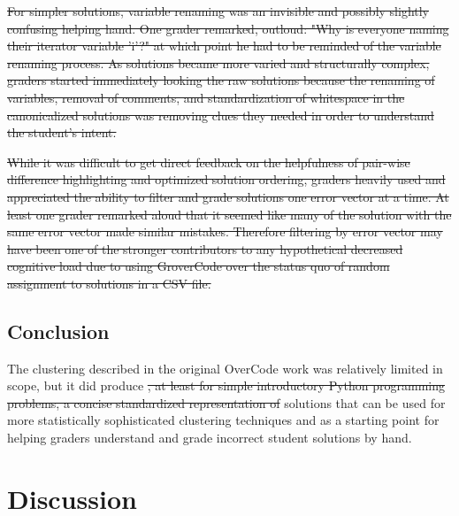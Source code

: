 \documentclass[12pt,twoside]{mitthesis}
\providecommand{\DIFaddtex}[1]{{\protect\color{blue}\uwave{#1}}} %
\providecommand{\DIFdeltex}[1]{{\protect\color{red}\sout{#1}}}                      %
\providecommand{\DIFaddbegin}{} %
\providecommand{\DIFaddend}{} %
\providecommand{\DIFdelbegin}{} %
\providecommand{\DIFdelend}{} %
\providecommand{\DIFadd}[1]{\texorpdfstring{\DIFaddtex{#1}}{#1}} %
\providecommand{\DIFdel}[1]{\texorpdfstring{\DIFdeltex{#1}}{}} %
\begin{document}
\DIFdel{For simpler solutions, variable renaming was an invisible and possibly slightly confusing helping hand. One grader remarked, outloud: "Why is everyone naming their iterator variable 'i'?" at which point he had to be reminded of the variable renaming process. As solutions became more varied and structurally complex, graders started immediately looking the raw solutions because the renaming of variables, removal of comments, and standardization of whitespace in the canonicalized solutions was removing clues they needed in order to understand the student's intent.
}%

\DIFdel{While it was difficult to get direct feedback on the helpfulness of pair-wise difference highlighting and optimized solution ordering, graders heavily used and appreciated the ability to filter and grade solutions one error vector at a time. At least one grader remarked aloud that it seemed like many of the solution with the same error vector made similar mistakes. Therefore filtering by error vector may have been one of the stronger contributors to any hypothetical decreased cognitive load due to using GroverCode over the status quo of random assignment to solutions in a CSV file.
}%


\DIFdelend \section{Conclusion}
The clustering described in the original OverCode work was relatively limited in scope, but it did produce \DIFdelbegin \DIFdel{, at least for simple introductory Python programming problems, a concise standardized representation of }\DIFdelend \DIFaddbegin \DIFadd{platonic }\DIFaddend solutions that can be used for more statistically sophisticated clustering techniques and as a starting point for helping graders understand and grade incorrect student solutions by hand.


\chapter{Discussion}\label{chapter:discussion}
\end{document}
